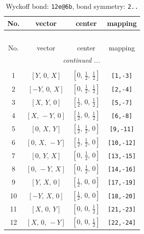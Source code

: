\documentclass[fleqn,8pt]{jsarticle}
\begin{document}
\renewcommand{\arraystretch}{1.2}
\begin{longtable}{cccc}
\caption{Wyckoff bond: {\tt 12e@6b}, bond symmetry: {\tt 2..}}
 \\
 \hline \hline
No. & vector & center & mapping \\ \hline \endfirsthead

\multicolumn{3}{l}{\tablename\ \thetable{}} \\
 \hline \hline
No. & vector & center & mapping \\ \hline \endhead

 \hline \hline
\multicolumn{3}{r}{\footnotesize\it continued ...} \\ \endfoot

 \hline \hline
\multicolumn{3}{r}{} \\ \endlastfoot

1 & $\left[ Y,\, 0,\, X \right]$ & $\left[ 0,\, \frac{1}{2},\, \frac{1}{2} \right]$ & {\tt [1,-3]} \\ \hline
2 & $\left[ - Y,\, 0,\, X \right]$ & $\left[ 0,\, \frac{1}{2},\, \frac{1}{2} \right]$ & {\tt [2,-4]} \\ \hline
3 & $\left[ X,\, Y,\, 0 \right]$ & $\left[ \frac{1}{2},\, 0,\, \frac{1}{2} \right]$ & {\tt [5,-7]} \\ \hline
4 & $\left[ X,\, - Y,\, 0 \right]$ & $\left[ \frac{1}{2},\, 0,\, \frac{1}{2} \right]$ & {\tt [6,-8]} \\ \hline
5 & $\left[ 0,\, X,\, Y \right]$ & $\left[ \frac{1}{2},\, \frac{1}{2},\, 0 \right]$ & {\tt [9,-11]} \\ \hline
6 & $\left[ 0,\, X,\, - Y \right]$ & $\left[ \frac{1}{2},\, \frac{1}{2},\, 0 \right]$ & {\tt [10,-12]} \\ \hline
7 & $\left[ 0,\, Y,\, X \right]$ & $\left[ 0,\, \frac{1}{2},\, 0 \right]$ & {\tt [13,-15]} \\ \hline
8 & $\left[ 0,\, - Y,\, X \right]$ & $\left[ 0,\, \frac{1}{2},\, 0 \right]$ & {\tt [14,-16]} \\ \hline
9 & $\left[ Y,\, X,\, 0 \right]$ & $\left[ \frac{1}{2},\, 0,\, 0 \right]$ & {\tt [17,-19]} \\ \hline
10 & $\left[ - Y,\, X,\, 0 \right]$ & $\left[ \frac{1}{2},\, 0,\, 0 \right]$ & {\tt [18,-20]} \\ \hline
11 & $\left[ X,\, 0,\, Y \right]$ & $\left[ 0,\, 0,\, \frac{1}{2} \right]$ & {\tt [21,-23]} \\ \hline
12 & $\left[ X,\, 0,\, - Y \right]$ & $\left[ 0,\, 0,\, \frac{1}{2} \right]$ & {\tt [22,-24]} \\
\end{longtable}
\end{document}

